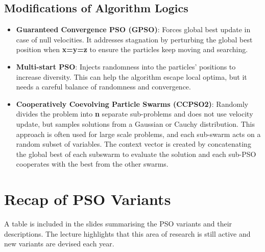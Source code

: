 \subsection*{Modifications of Algorithm Logics}
\begin{itemize}
    \item \textbf{Guaranteed Convergence PSO (GPSO)}: Forces global best update in case of null velocities. It addresses stagnation by perturbing the global best position when \textbf{x=y=z} to ensure the particles keep moving and searching.
    \item \textbf{Multi-start PSO}: Injects randomness into the particles' positions to increase diversity. This can help the algorithm escape local optima, but it needs a careful balance of randomness and convergence.
    \item \textbf{Cooperatively Coevolving Particle Swarms (CCPSO2)}: Randomly divides the problem into \textbf{n} separate sub-problems and does not use velocity update, but samples solutions from a Gaussian or Cauchy distribution. This approach is often used for large scale problems, and each sub-swarm acts on a random subset of variables. The context vector is created by concatenating the global best of each subswarm to evaluate the solution and each sub-PSO cooperates with the best from the other swarms.
\end{itemize}

\section{Recap of PSO Variants}
A table is included in the slides summarising the PSO variants and their descriptions. The lecture highlights that this area of research is still active and new variants are devised each year.

